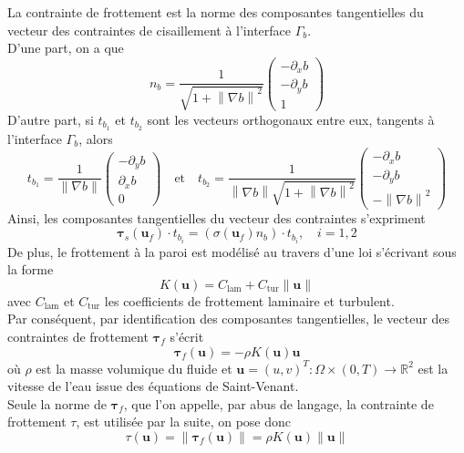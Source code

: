 \documentclass[11pt, a4paper, oneside]{report}
\begin{document}
La contrainte de frottement est la norme des composantes tangentielles du vecteur des contraintes de cisaillement à l'interface $\Gamma_b$. \\
D'une part, on a que
\begin{equation}
    n_b = \frac{1}{\sqrt{1 + \left\| \nabla b \right\|^2}} \begin{pmatrix} -\partial_x b \\ -\partial_y b \\ 1 \end{pmatrix}
\end{equation}
D'autre part, si $t_{b_1}$ et $t_{b_2}$ sont les vecteurs orthogonaux entre eux, tangents à l'interface $\Gamma_b$, alors
\begin{equation}
    t_{b_1} = \frac{1}{\| \nabla b \|} \begin{pmatrix} - \partial_y b \\ \partial_x b \\ 0 \end{pmatrix} \quad \text{et} \quad t_{b_2} = \frac{1}{\left\| \nabla b \right\| \sqrt{1 + \left\| \nabla b \right\|^2}} \begin{pmatrix} - \partial_x b \\ - \partial_y b \\ - \left\| \nabla b \right\|^2 \end{pmatrix}
\end{equation}
Ainsi, les composantes tangentielles du vecteur des contraintes s'expriment
\begin{equation}
    \bm{\tau}_s(\bm{u}_f) \cdot t_{b_i} = \left( \sigma(\bm{u}_f) n_b \right) \cdot t_{b_i}, \quad i = 1, 2
\end{equation} 
De plus, le frottement à la paroi est modélisé au travers d'une loi s'écrivant sous la forme
\begin{equation}
    K(\bm{u}) = C_\text{lam} + C_\text{tur} \left\| \bm{u} \right\|
\end{equation}
avec $C_\text{lam}$ et $C_\text{tur}$ les coefficients de frottement laminaire et turbulent. \\
Par conséquent, par identification des composantes tangentielles, le vecteur des contraintes de frottement $\bm{\tau}_f$ s'écrit
\begin{equation}
    \bm{\tau}_f(\bm{u}) = -\rho K(\bm{u}) \bm{u}
\end{equation}
où $\rho$ est la masse volumique du fluide et $\bm{u} = (u, v)^T : \Omega \times (0, T) \longrightarrow \mathbb{R}^2$ est la vitesse de l'eau issue des équations de Saint-Venant. \\
Seule la norme de $\bm{\tau}_f$, que l'on appelle, par abus de langage, la contrainte de frottement $\tau$, est utilisée par la suite, on pose donc
\begin{equation}
    \tau(\bm{u}) = \left\| \bm{\tau}_f(\bm{u}) \right\| = \rho K(\bm{u}) \left\| \bm{u} \right\|
\end{equation}
\end{document}
